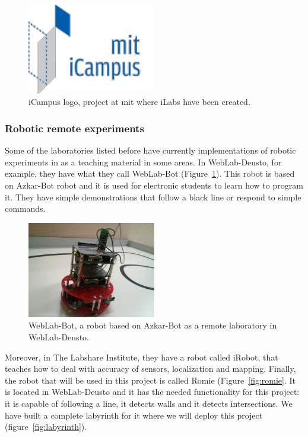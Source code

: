 \begin{figure}[!htbp]
	\centering
	\includegraphics[width=0.5\textwidth]{fig/icampus}
	\caption{iCampus logo, project at \acrshort{mit} where iLabs have been created.}
\end{figure}

\subsubsection{Robotic remote experiments}

Some of the laboratories listed before have currently implementations of robotic experiments in
as a teaching material in some areas. In WebLab-Deusto, for example, they have what they call
WebLab-Bot (Figure~\ref{fig:weblab-bot}). This robot is based on Azkar-Bot robot and it is used for
electronic students to learn how to program it. They have simple demonstrations that follow a black
line or respond to simple commands.

\begin{figure}[!htbp]
	\centering
	\includegraphics[width=0.5\textwidth]{fig/weblab-bot}
	\caption{WebLab-Bot, a robot based on Azkar-Bot as a remote laboratory in WebLab-Deusto.}
	\label{fig:weblab-bot}
\end{figure}

Moreover, in The Labshare Institute, they have a robot called iRobot, that teaches how to deal with
accuracy of sensors, localization and mapping. Finally, the robot that will be used in this
project is called Romie (Figure~\ref{fig:romie}. It is located in WebLab-Deusto and it has the
needed functionality for this project: it is capable of following a line, it detects walls and it
detects intersections. We have built a complete labyrinth for it where we will deploy this project
(figure~\ref{fig:labyrinth}).

